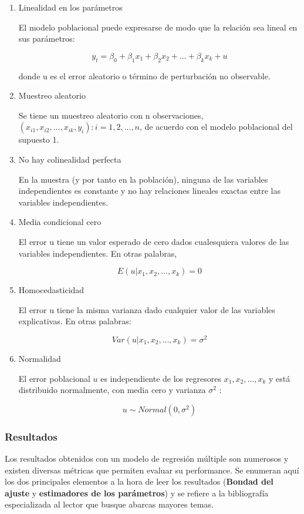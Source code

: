 \begin{enumerate}
	\item Linealidad en los parámetros
	
	El modelo poblacional puede expresarse de modo que la relación sea lineal en sus parámetros: 
	
	$$y_t = \beta_0 + \beta_1 x_1 + \beta_2 x_2 + ... + \beta_k x_k + u$$
	
	donde u es el error aleatorio o término de perturbación no observable.
	
	\item Muestreo aleatorio
	
	Se tiene un muestreo aleatorio con n observaciones, ${(x_{i1} , x_{i2}, ..., x_{ik}, y_i ): i = 1, 2, ..., n} $, de acuerdo con el modelo poblacional del supuesto 1.
	
	
	\item  No hay colinealidad perfecta
	
	En la muestra (y por tanto en la población), ninguna de las variables independientes es constante y no hay relaciones lineales exactas entre las variables independientes. 
	
	\item  Media condicional cero
	
	El error u tiene un valor esperado de cero dados cualesquiera valores de las variables independientes.
	En otras palabras,
	
	$$E(u|x_1,x_2, ..., x_k ) = 0$$
	
	\item Homocedasticidad
	
	El error u tiene la misma varianza dado cualquier valor de las variables explicativas. En otras palabras:
	
	$$ Var(u|x_1,x_2, ..., x_k )= \sigma^2 $$
	
	\item Normalidad 
	
	El error poblacional $u$ es independiente de los regresores $x_1,x_2, ..., x_k$ y está distribuido normalmente, con media cero y varianza $\sigma^2$ : 
	
	$$u \sim Normal(0,\sigma^2 )$$
	
\end{enumerate}

\subsubsection{Resultados}

Los resultados obtenidos con un modelo de regresión múltiple son numerosos y existen diversas métricas que permiten evaluar su performance. Se enumeran aquí los dos principales elementos a la hora de leer los resultados (\textbf{Bondad del ajuste} y \textbf{estimadores de los parámetros}) y se refiere a la bibliografía especializada \cite{wooldridge,hastie} al lector que busque abarcas mayores temas.  

